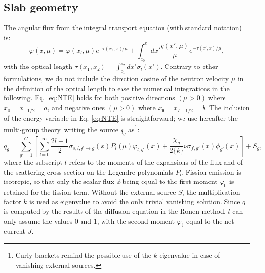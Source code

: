 \documentclass{ictt26}
\begin{document}
\subsection{Slab geometry}
\label{sec:slab}
The angular flux from the integral transport equation (with standard notation) is:
\begin{equation}
\varphi(x, \mu) = \varphi(x_b, \mu) e^{-\tau(x_b, x)/\mu} + \int_{x_0}^x {dx' \frac{q(x', \mu)}{\mu} e^{-\tau(x', x)/\mu}},
\label{eq:NTE}
\end{equation}
with the optical length $\tau(x_1, x_2) = \int_{x_1}^{x_2}{dx' \sigma_t(x')}$. Contrary to other formulations, we do not include the direction cosine of the neutron velocity $\mu$ in the definition of the optical length to ease the numerical integrations in the following. Eq. \ref{eq:NTE} holds for both positive directions $(\mu > 0)$ where $x_0 = x_{-1/2} = a$, and negative ones $(\mu > 0)$ where $x_0 = x_{I-1/2} = b$. The inclusion of the energy variable in Eq. \ref{eq:NTE} is straightforward; we use hereafter the multi-group theory, writing the source $q_g$ as\footnote{Curly brackets remind the possible use of the $k$-eigenvalue in case of vanishing external sources.}:
\begin{equation}
\label{eq:srcg}
q_g = \sum_{g'=1}^G{\left[
  \sum_{l=0}^\infty{ \frac{2l+1}{2}\sigma_{s,l, g' \rightarrow g}(x)P_l(\mu)\varphi_{l,g'}(x)
  + \frac{\chi_g}{2\{k\}} \nu\sigma_{f,g'}(x)\phi_{g'}(x)}\right] + S_g
                 },
\end{equation}
where the subscript $l$ refers to the moments of the expansions of the flux and of the scattering cross section on the Legendre polynomials $P_l$. Fission emission is isotropic, so that only the scalar flux $\phi$ being equal to the first moment $\varphi_0$ is retained for the fission term. Without the external source $S$, the multiplication factor $k$ is used as eigenvalue to avoid the only trivial vanishing solution. Since $q$ is computed by the results of the diffusion equation in the Ronen method, $l$ can only assume the values 0 and 1, with the second moment $\varphi_1$ equal to the net current $J$.%
\end{document}
